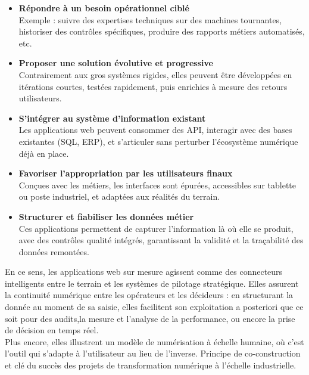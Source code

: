 \documentclass[11pt,a4paper]{article}
\begin{document}
\begin{itemize}
    \item \textbf{Répondre à un besoin opérationnel ciblé} \\
    Exemple : suivre des expertises techniques sur des machines tournantes, historiser des contrôles spécifiques, produire des rapports métiers automatisés, etc.

    \item \textbf{Proposer une solution évolutive et progressive} \\
    Contrairement aux gros systèmes rigides, elles peuvent être développées en itérations courtes, testées rapidement, puis enrichies à mesure des retours utilisateurs.

    \item \textbf{S’intégrer au système d’information existant} \\
    Les applications web peuvent consommer des API, interagir avec des bases existantes (SQL, ERP), et s’articuler sans perturber l’écosystème numérique déjà en place.

    \item \textbf{Favoriser l’appropriation par les utilisateurs finaux} \\
    Conçues avec les métiers, les interfaces sont épurées, accessibles sur tablette ou poste industriel, et adaptées aux réalités du terrain.

    \item \textbf{Structurer et fiabiliser les données métier} \\
    Ces applications permettent de capturer l'information là où elle se produit, avec des contrôles qualité intégrés, garantissant la validité et la traçabilité des données remontées.
\end{itemize}


En ce sens, les applications web sur mesure agissent comme des connecteurs intelligents entre le terrain et les systèmes de pilotage stratégique. Elles assurent la continuité numérique entre les opérateurs et les décideurs : en structurant la donnée au moment de sa saisie, elles facilitent son exploitation a posteriori que ce soit pour des audits,la mesure et l'analyse de la performance, ou encore la prise de décision en temps réel.
\\
Plus encore, elles illustrent un modèle de numérisation à échelle humaine, où c’est l’outil qui s’adapte à l’utilisateur au lieu de l’inverse. Principe de co-construction et clé du succès des projets de transformation numérique à l’échelle industrielle.
\end{document}
